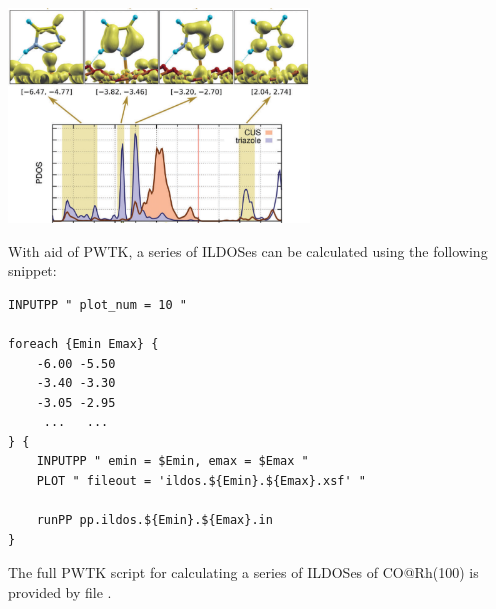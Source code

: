 \documentclass[landscape]{foils}
\begin{document}
\begin{center}
  \includegraphics[width=0.6\textwidth]{figs/ildos.png}
\end{center}

With aid of PWTK, a series of ILDOSes can be calculated using the following snippet:
{
  \codecolor\small
\begin{verbatim}
INPUTPP " plot_num = 10 "

foreach {Emin Emax} {
    -6.00 -5.50
    -3.40 -3.30
    -3.05 -2.95
     ...   ...
} {
    INPUTPP " emin = $Emin, emax = $Emax "
    PLOT " fileout = 'ildos.${Emin}.${Emax}.xsf' "

    runPP pp.ildos.${Emin}.${Emax}.in
}
\end{verbatim}
}

The full PWTK script for calculating a series of ILDOSes of
CO@Rh(100) is provided by file .
\end{document}
